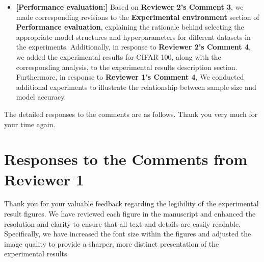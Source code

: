 \documentclass[a4paper,twoside,11pt,dvipsnames]{reviewresponse}
\begin{document}
\begin{itemize}
\item \textbf{[Performance evaluation:]} Based on \textbf{Reviewer 2's Comment 3}, we made corresponding revisions to the \textbf{Experimental environment} section of \textbf{Performance evaluation}, explaining the rationale behind selecting the appropriate model structures and hyperparameters for different datasets in the experiments. Additionally, in response to \textbf{Reviewer 2's Comment 4}, we added the experimental results for CIFAR-100, along with the corresponding analysis, to the experimental results description section. Furthermore, in response to \textbf{Reviewer 1's Comment 4}, We conducted additional experiments to illustrate the relationship between sample size and model accuracy.

\end{itemize}

\color{black}
The detailed responses to the comments are as follows. Thank you very much for your time again.



\newpage





\section{Responses to the Comments from Reviewer 1}


Thank you for your valuable feedback regarding the legibility of the experimental result figures. We have reviewed each figure in the manuscript and enhanced the resolution and clarity to ensure that all text and details are easily readable. Specifically, we have increased the font size within the figures and adjusted the image quality to provide a sharper, more distinct presentation of the experimental results.
\end{document}
